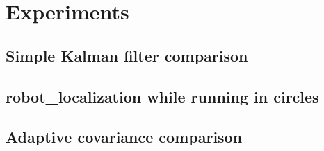 \chapter{Experiments}\label{cha:experiments}
\pagestyle{scrheadings}

\section{Simple Kalman filter comparison}\label{sec:exp_comp}

\section{robot\_localization while running in circles}\label{sec:exp_circle}

\section{Adaptive covariance comparison}\label{sec:exp_covar}

